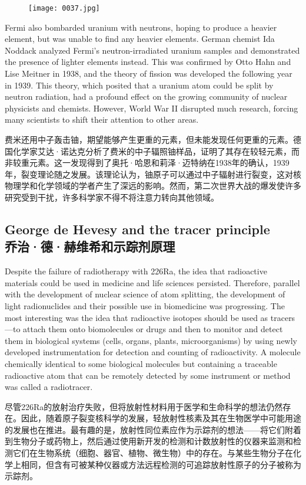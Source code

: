 \documentclass[dvipsnames, svgnames,a4paper,11pt]{article}
\begin{document}
\begin{figure}[htbp]
      \centering
      \texttt{[image: 0037.jpg]}
       \label{fig27}
\end{figure}

Fermi also bombarded uranium with neutrons, hoping to produce a heavier element, but was unable to find any heavier elements. German chemist Ida Noddack analyzed Fermi’s neutron-irradiated uranium samples and demonstrated the presence of lighter elements instead. This was confirmed by Otto Hahn and Lise Meitner in 1938, and the theory of fission was developed the following year in 1939. This theory, which posited that a uranium atom could be split by neutron radiation, had a profound effect on the growing community of nuclear physicists and chemists. However, World War II disrupted much research, forcing many scientists to shift their attention to other areas.

费米还用中子轰击铀，期望能够产生更重的元素，但未能发现任何更重的元素。德国化学家艾达·诺达克分析了费米的中子辐照铀样品，证明了其存在较轻元素，而非较重元素。这一发现得到了奥托·哈恩和莉泽·迈特纳在1938年的确认，1939年，裂变理论随之发展。该理论认为，铀原子可以通过中子辐射进行裂变，这对核物理学和化学领域的学者产生了深远的影响。然而，第二次世界大战的爆发使许多研究受到干扰，许多科学家不得不将注意力转向其他领域。

\subsection{George de Hevesy and the tracer principle\\乔治·德·赫维希和示踪剂原理}
Despite the failure of radiotherapy with 226Ra, the idea that radioactive materials could be used in medicine and life sciences persisted. Therefore, parallel with the development of nuclear science of atom splitting, the development of light radionuclides and their possible use in biomedicine was progressing. The most interesting was the idea that radioactive isotopes should be used as tracers—to attach them onto biomolecules or drugs and then to monitor and detect them in biological systems (cells, organs, plants, microorganisms) by using newly developed instrumentation for detection and counting of radioactivity. A molecule chemically identical to some biological molecules but containing a traceable radioactive atom that can be remotely detected by some instrument or method was called a radiotracer.

尽管226Ra的放射治疗失败，但将放射性材料用于医学和生命科学的想法仍然存在。因此，随着原子裂变核科学的发展，轻放射性核素及其在生物医学中可能用途的发展也在推进。最有趣的是，放射性同位素应作为示踪剂的想法——将它们附着到生物分子或药物上，然后通过使用新开发的检测和计数放射性的仪器来监测和检测它们在生物系统（细胞、器官、植物、微生物）中的存在。与某些生物分子在化学上相同，但含有可被某种仪器或方法远程检测的可追踪放射性原子的分子被称为示踪剂。
\end{document}
